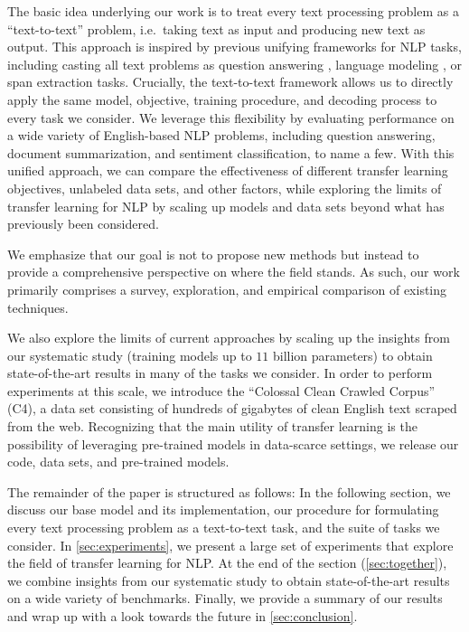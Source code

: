 The basic idea underlying our work is to treat every text processing problem as a ``text-to-text'' problem, i.e.\ taking text as input and producing new text as output. This approach is inspired by previous unifying frameworks for NLP tasks, including casting all text problems as question answering  \citep{mccann2018natural}, language modeling \citep{radford2019language}, or span extraction \cite{keskar2019unifying} tasks. Crucially, the text-to-text framework allows us to directly apply the same model, objective, training procedure, and decoding process to every task we consider. We leverage this flexibility by evaluating performance on a wide variety of English-based NLP problems, including question answering, document summarization, and sentiment classification, to name a few. With this unified approach, we can compare the effectiveness of different transfer learning objectives, unlabeled data sets, and other factors, while exploring the limits of transfer learning for NLP by scaling up models and data sets beyond what has previously been considered.

We emphasize that our goal is not to propose new methods but instead to provide a comprehensive perspective on where the field stands. As such, our work primarily comprises a survey, exploration, and empirical comparison of existing techniques.

We also explore the limits of current approaches by scaling up the insights from our systematic study (training models up to $11$ billion parameters) to obtain state-of-the-art results in many of the tasks we consider. In order to perform experiments at this scale, we introduce the ``Colossal Clean Crawled Corpus'' (C4), a data set consisting of hundreds of gigabytes of clean English text scraped from the web. Recognizing that the main utility of transfer learning is the possibility of leveraging pre-trained models in data-scarce settings, we release our code, data sets, and pre-trained models.

The remainder of the paper is structured as follows: In the following section, we discuss our base model and its implementation, our procedure for formulating every text processing problem as a text-to-text task, and the suite of tasks we consider. In \ref{sec:experiments}, we present a large set of experiments that explore the field of transfer learning for NLP. At the end of the section (\ref{sec:together}), we combine insights from our systematic study to obtain state-of-the-art results on a wide variety of benchmarks. Finally, we provide a summary of our results and wrap up with a look towards the future in \ref{sec:conclusion}.

